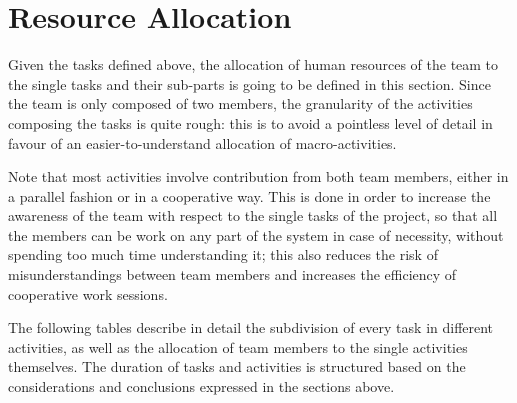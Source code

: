 
\section{Resource Allocation}
Given the tasks defined above, the allocation of human resources of the team to the single tasks and their sub-parts is going to be defined in this section. Since the team is only composed of two members, the granularity of the activities composing the tasks is quite rough: this is to avoid a pointless level of detail in favour of an easier-to-understand allocation of macro-activities.

Note that most activities involve contribution from both team members, either in a parallel fashion or in a cooperative way. This is done in order to increase the awareness of the team with respect to the single tasks of the project, so that all the members can be work on any part of the system in case of necessity, without spending too much time understanding it; this also reduces the risk of misunderstandings between team members and increases the efficiency of cooperative work sessions.

The following tables describe in detail the subdivision of every task in different activities, as well as the allocation of team members to the single activities themselves. The duration of tasks and activities is structured based on the considerations and conclusions expressed in the sections above.


